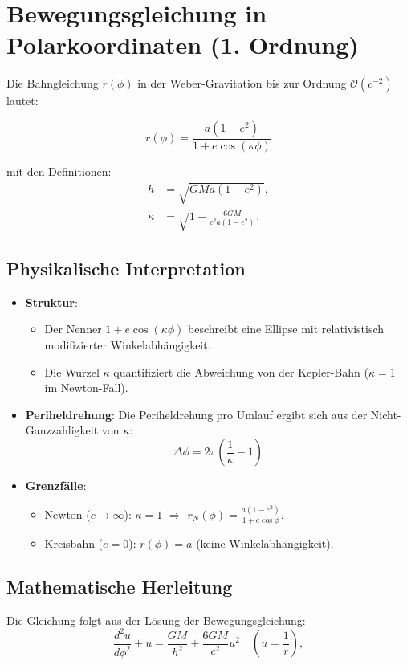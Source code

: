 \newpage
\section{Bewegungsgleichung in Polarkoordinaten (1. Ordnung)}
Die Bahngleichung \(r(\phi)\) in der Weber-Gravitation bis zur Ordnung \(\mathcal{O}(c^{-2})\) lautet:

\begin{equation}
r(\phi) = \frac{a(1 - e^2)}{1 + e \cos\left(\kappa\phi\right)}
\end{equation}

\noindent mit den Definitionen:
\begin{align*}
h &= \sqrt{GMa(1 - e^2)}, \\
\kappa &= \sqrt{1 - \frac{6GM}{c^2a(1 - e^2)}}.
\end{align*}

\subsection*{Physikalische Interpretation}
\begin{itemize}
    \item \textbf{Struktur}: 
        \begin{itemize}
            \item Der Nenner \(1 + e \cos(\kappa\phi)\) beschreibt eine Ellipse mit relativistisch\\modifizierter Winkelabhängigkeit.
            \item Die Wurzel \(\kappa\) quantifiziert die Abweichung von der Kepler-Bahn (\(\kappa = 1\) im Newton-Fall).
        \end{itemize}
    \item \textbf{Periheldrehung}:
        Die Periheldrehung pro Umlauf ergibt sich aus der Nicht-Ganzzahligkeit von \(\kappa\):
        \[
        \Delta\phi = 2\pi\left(\frac{1}{\kappa} - 1\right)
        \]
    \item \textbf{Grenzfälle}:
        \begin{itemize}
            \item Newton (\(c \to \infty\)): \(\kappa = 1\) \(\Rightarrow\) \(r_N(\phi) = \frac{a(1 - e^2)}{1 + e \cos\phi}\).
            \item Kreisbahn (\(e = 0\)): \(r(\phi) = a\) (keine Winkelabhängigkeit).
        \end{itemize}
\end{itemize}

\subsection*{Mathematische Herleitung}
Die Gleichung folgt aus der Lösung der Bewegungsgleichung:
\begin{equation}
\frac{d^2u}{d\phi^2} + u = \frac{GM}{h^2} + \frac{6GM}{c^2} u^2 \quad \left(u = \frac{1}{r}\right),
\end{equation}

